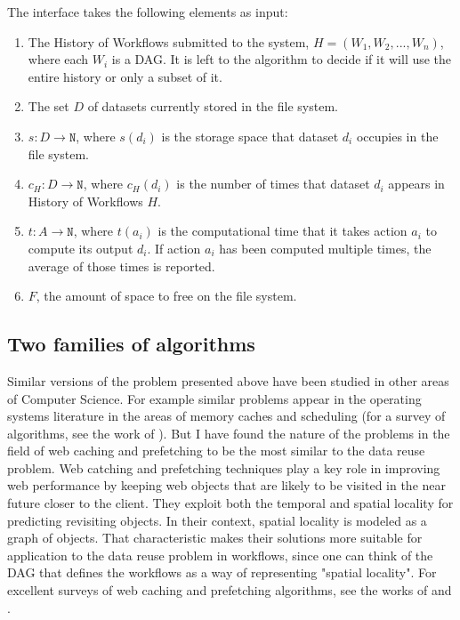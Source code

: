 The interface takes the following elements as input:

\begin{enumerate}
\item The History of Workflows submitted to the system, $H = (W_1, W_2, ..., W_n)$, where each $W_i$ is a DAG. It is left to the algorithm to decide if it will use the entire history or only a subset of it.

\item The set $D$ of datasets currently stored in the file system. 

\item $s: D \to \mathtt{N} $, where $s(d_i)$ is the storage space that dataset $d_i$ occupies in the file system.

\item $c_H: D \to \mathtt{N}$, where $c_H(d_i)$ is the number of times that dataset $d_i$ appears in History of Workflows $H$.

\item $t: A \to \mathtt{N}$, where $t(a_i)$ is the computational time that it takes action $a_i$ to compute its output $d_i$.  If action $a_i$ has been computed multiple times, the average of those times is reported.

\item $F$, the amount of space to free on the file system.

\end{enumerate}

\subsection{Two families of algorithms}
Similar versions of the problem presented above have been studied in other areas of Computer Science.  For example similar problems appear in the operating systems literature in the areas of memory caches \citep{smith1982cache} and scheduling (for a survey of algorithms, see the work of \cite{ramamritham1994scheduling}). But I have found the nature of the problems in the field of web caching and prefetching to be the most similar to the data reuse problem.  Web catching and prefetching techniques play a key role in improving web performance by keeping web objects that are likely to be visited in the near future closer to the client. They exploit both the temporal and spatial locality for predicting revisiting objects. In their context, spatial locality is modeled as a graph of objects. That characteristic makes their solutions more suitable for application to the data reuse problem in workflows, since one can think of the DAG that defines the workflows as a way of representing "spatial locality".  For excellent surveys of web caching and prefetching algorithms, see the works of \cite{wang1999survey} and \cite{ali2011survey}.


